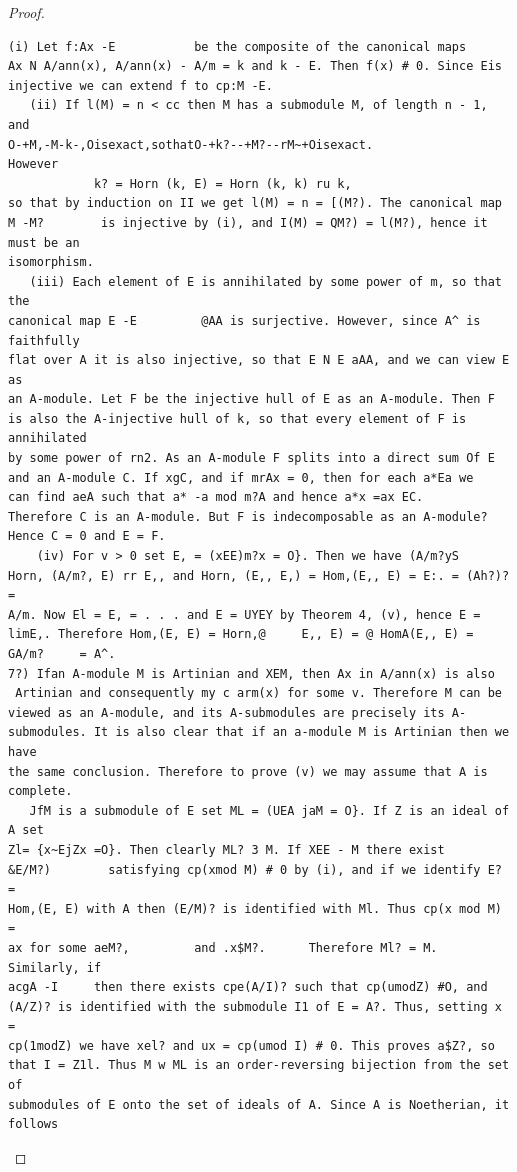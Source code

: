 \begin{proof}
\begin{verbatim}
(i) Let f:Ax -E           be the composite of the canonical maps
Ax N A/ann(x), A/ann(x) - A/m = k and k - E. Then f(x) # 0. Since Eis
injective we can extend f to cp:M -E.
   (ii) If l(M) = n < cc then M has a submodule M, of length n - 1, and
O-+M,-M-k-,Oisexact,sothatO-+k?--+M?--rM~+Oisexact.
However
            k? = Horn (k, E) = Horn (k, k) ru k,
so that by induction on II we get l(M) = n = [(M?). The canonical map
M -M?        is injective by (i), and I(M) = QM?) = l(M?), hence it must be an
isomorphism.
   (iii) Each element of E is annihilated by some power of m, so that the
canonical map E -E         @AA is surjective. However, since A^ is faithfully
flat over A it is also injective, so that E N E aAA, and we can view E as
an A-module. Let F be the injective hull of E as an A-module. Then F
is also the A-injective hull of k, so that every element of F is annihilated
by some power of rn2. As an A-module F splits into a direct sum Of E
and an A-module C. If xgC, and if mrAx = 0, then for each a*Ea we
can find aeA such that a* -a mod m?A and hence a*x =ax EC.
Therefore C is an A-module. But F is indecomposable as an A-module?
Hence C = 0 and E = F.
    (iv) For v > 0 set E, = (xEE)m?x = O}. Then we have (A/m?yS
Horn, (A/m?, E) rr E,, and Horn, (E,, E,) = Hom,(E,, E) = E:. = (Ah?)? =
A/m. Now El = E, = . . . and E = UYEY by Theorem 4, (v), hence E =
limE,. Therefore Hom,(E, E) = Horn,@     E,, E) = @ HomA(E,, E) =
GA/m?     = A^.
7?) Ifan A-module M is Artinian and XEM, then Ax in A/ann(x) is also
 Artinian and consequently my c arm(x) for some v. Therefore M can be
viewed as an A-module, and its A-submodules are precisely its A-
submodules. It is also clear that if an a-module M is Artinian then we have
the same conclusion. Therefore to prove (v) we may assume that A is
complete.
   JfM is a submodule of E set ML = (UEA jaM = O}. If Z is an ideal of A set
Zl= {x~EjZx =O}. Then clearly ML? 3 M. If XEE - M there exist
&E/M?)        satisfying cp(xmod M) # 0 by (i), and if we identify E? =
Hom,(E, E) with A then (E/M)? is identified with Ml. Thus cp(x mod M) =
ax for some aeM?,         and .x$M?.      Therefore Ml? = M. Similarly, if
acgA -I     then there exists cpe(A/I)? such that cp(umodZ) #O, and
(A/Z)? is identified with the submodule I1 of E = A?. Thus, setting x =
cp(1modZ) we have xel? and ux = cp(umod I) # 0. This proves a$Z?, so
that I = Z1l. Thus M w ML is an order-reversing bijection from the set of
submodules of E onto the set of ideals of A. Since A is Noetherian, it follows

\end{verbatim}
\end{proof}

